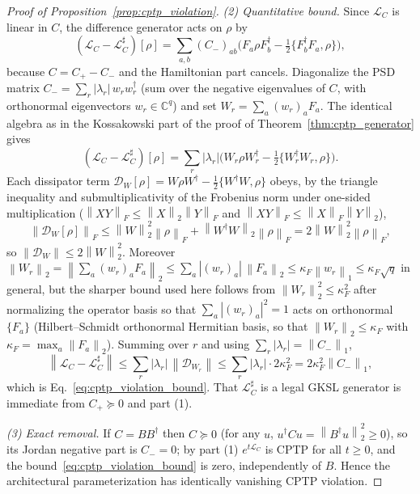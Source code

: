 \documentclass[twocolumn,aps,prxquantum,superscriptaddress,nofootinbib,floatfix,longbibliography]{revtex4-2}
\newcommand{\C}{\mathbb{C}}
\newcommand{\calD}{\mathcal{D}}
\newcommand{\calL}{\mathcal{L}}
\newcommand{\norm}[1]{\left\lVert #1 \right\rVert}
\newcommand{\abs}[1]{\left\lvert #1 \right\rvert}
\begin{document}
\begin{proof}[Proof of Proposition~\ref{prop:cptp_violation}]
\emph{(2) Quantitative bound.} Since $\calL_C$ is linear in $C$, the difference generator acts on $\rho$ by
\[
(\calL_C-\calL_C^\sharp)[\rho]=\sum_{a,b}(C_-)_{ab}\Big(F_a\rho F_b^\dagger-\tfrac12\{F_b^\dagger F_a,\rho\}\Big),
\]
because $C=C_+-C_-$ and the Hamiltonian part cancels. Diagonalize the PSD matrix $C_-=\sum_{r}\abs{\lambda_r}\,w_rw_r^\dagger$ (sum over the negative eigenvalues of $C$, with orthonormal eigenvectors $w_r\in\C^q$) and set $W_r=\sum_a(w_r)_aF_a$. The identical algebra as in the Kossakowski part of the proof of Theorem~\ref{thm:cptp_generator} gives
\[
(\calL_C-\calL_C^\sharp)[\rho]=\sum_{r}\abs{\lambda_r}\Big(W_r\rho W_r^\dagger-\tfrac12\{W_r^\dagger W_r,\rho\}\Big).
\]
Each dissipator term $\calD_{W}[\rho]=W\rho W^\dagger-\tfrac12\{W^\dagger W,\rho\}$ obeys, by the triangle inequality and submultiplicativity of the Frobenius norm under one-sided multiplication ($\norm{XY}_F\le\norm{X}_2\norm{Y}_F$ and $\norm{XY}_F\le\norm{X}_F\norm{Y}_2$),
\[
\norm{\calD_W[\rho]}_F\le\norm{W}_2^2\norm{\rho}_F+\norm{W^\dagger W}_2\norm{\rho}_F=2\norm{W}_2^2\norm{\rho}_F,
\]
so $\norm{\calD_W}\le2\norm{W}_2^2$. Moreover $\norm{W_r}_2=\norm{\sum_a(w_r)_aF_a}_2\le\sum_a\abs{(w_r)_a}\,\norm{F_a}_2\le\kappa_F\norm{w_r}_1\le\kappa_F\sqrt{q}$ in general, but the sharper bound used here follows from $\norm{W_r}_2^2\le\kappa_F^2$ after normalizing the operator basis so that $\sum_a\abs{(w_r)_a}^2=1$ acts on orthonormal $\{F_a\}$ (Hilbert--Schmidt orthonormal Hermitian basis, so that $\norm{W_r}_2\le\kappa_F$ with $\kappa_F=\max_a\norm{F_a}_2$). Summing over $r$ and using $\sum_r\abs{\lambda_r}=\norm{C_-}_1$,
\[
\norm{\calL_C-\calL_C^\sharp}\le\sum_r\abs{\lambda_r}\,\norm{\calD_{W_r}}\le\sum_r\abs{\lambda_r}\cdot2\kappa_F^2=2\kappa_F^2\norm{C_-}_1,
\]
which is Eq.~\eqref{eq:cptp_violation_bound}. That $\calL_C^\sharp$ is a legal GKSL generator is immediate from $C_+\succeq0$ and part (1).

\emph{(3) Exact removal.} If $C=BB^\dagger$ then $C\succeq0$ (for any $u$, $u^\dagger Cu=\norm{B^\dagger u}_2^2\ge0$), so its Jordan negative part is $C_-=0$; by part (1) $e^{t\calL_C}$ is CPTP for all $t\ge0$, and the bound~\eqref{eq:cptp_violation_bound} is zero, independently of $B$. Hence the architectural parameterization has identically vanishing CPTP violation.
\end{proof}
\end{document}
